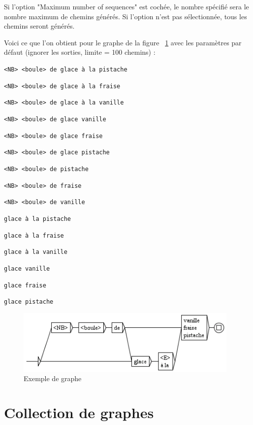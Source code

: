 \noindent Si l’option "Maximum number of sequences" est cochée, le nombre spécifié sera le nombre
maximum de chemins générés. Si l’option n’est pas sélectionnée, tous les chemins seront générés.


\bigskip
\noindent Voici ce que l’on obtient pour le graphe de la figure ~\ref{fig-glace} 
 avec les paramètres par défaut (ignorer les sorties, limite = 100 chemins) :


\bigskip
\noindent
\texttt{<NB> <boule> de glace \`a la pistache}

\noindent
\texttt{<NB> <boule> de glace \`a la fraise}

\noindent
\texttt{<NB> <boule> de glace \`a la vanille}

\noindent
\texttt{<NB> <boule> de glace vanille}

\noindent
\texttt{<NB> <boule> de glace fraise}

\noindent
\texttt{<NB> <boule> de glace pistache}

\noindent
\texttt{<NB> <boule> de pistache}

\noindent
\texttt{<NB> <boule> de fraise}

\noindent
\texttt{<NB> <boule> de vanille}

\noindent
\texttt{glace \`a la pistache}

\noindent
\texttt{glace \`a la fraise}

\noindent
\texttt{glace \`a la vanille}

\noindent
\texttt{glace vanille}

\noindent
\texttt{glace fraise}

\noindent
\texttt{glace pistache}

\begin{figure}[!h]
\begin{center}
\includegraphics[width=10.9cm]{resources/img/fig6-19.png}
\caption{Exemple de graphe \label{fig-glace}}
\end{center}
\end{figure}




\section{Collection de graphes}

